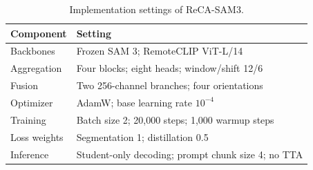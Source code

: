 \begin{table}[!t]
\centering
\caption{Implementation settings of ReCA-SAM3.}
\label{tab:implementation}
\small
\begin{tabular}{lL{0.62\columnwidth}}
\toprule
Component & Setting\\
\midrule
Backbones & Frozen SAM 3; RemoteCLIP ViT-L/14\\
Aggregation & Four blocks; eight heads; window/shift 12/6\\
Fusion & Two 256-channel branches; four orientations\\
Optimizer & AdamW; base learning rate $10^{-4}$\\
Training & Batch size 2; 20,000 steps; 1,000 warmup steps\\
Loss weights & Segmentation 1; distillation 0.5\\
Inference & Student-only decoding; prompt chunk size 4; no TTA\\
\bottomrule
\end{tabular}
\end{table}

